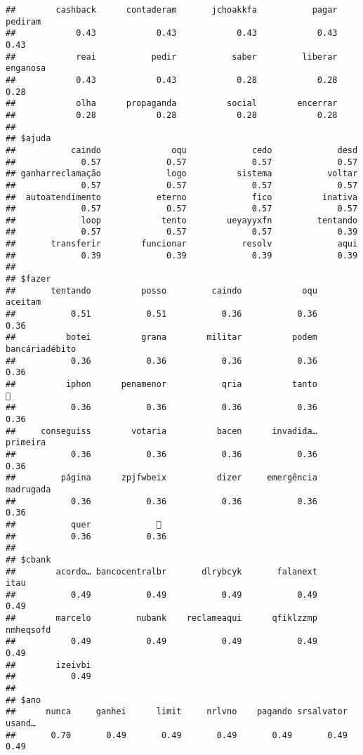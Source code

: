 \documentclass[
]{article}
\begin{document}
\begin{verbatim}
##        cashback      contaderam       jchoakkfa           pagar         pediram 
##            0.43            0.43            0.43            0.43            0.43 
##            reai           pedir           saber         liberar        enganosa 
##            0.43            0.43            0.28            0.28            0.28 
##            olha      propaganda          social        encerrar 
##            0.28            0.28            0.28            0.28 
## 
## $ajuda
##           caindo              oqu             cedo             desd 
##             0.57             0.57             0.57             0.57 
## ganharreclamação             logo          sistema           voltar 
##             0.57             0.57             0.57             0.57 
##  autoatendimento           eterno             fico          inativa 
##             0.57             0.57             0.57             0.57 
##             loop            tento        ueyayyxfn         tentando 
##             0.57             0.57             0.57             0.39 
##       transferir        funcionar           resolv             aqui 
##             0.39             0.39             0.39             0.39 
## 
## $fazer
##       tentando          posso         caindo            oqu        aceitam 
##           0.51           0.51           0.36           0.36           0.36 
##          botei          grana        militar          podem bancáriadébito 
##           0.36           0.36           0.36           0.36           0.36 
##          iphon      penamenor           qria          tanto             🥺 
##           0.36           0.36           0.36           0.36           0.36 
##     conseguiss        votaria          bacen      invadida…       primeira 
##           0.36           0.36           0.36           0.36           0.36 
##         página      zpjfwbeix          dizer     emergência      madrugada 
##           0.36           0.36           0.36           0.36           0.36 
##           quer             🤔 
##           0.36           0.36 
## 
## $cbank
##        acordo… bancocentralbr       dlrybcyk       falanext           itau 
##           0.49           0.49           0.49           0.49           0.49 
##        marcelo         nubank    reclameaqui      qfiklzzmp      nmheqsofd 
##           0.49           0.49           0.49           0.49           0.49 
##        izeivbi 
##           0.49 
## 
## $ano
##      nunca     ganhei      limit     nrlvno    pagando srsalvator     usand… 
##       0.70       0.49       0.49       0.49       0.49       0.49       0.49 

\end{verbatim}
\end{document}
